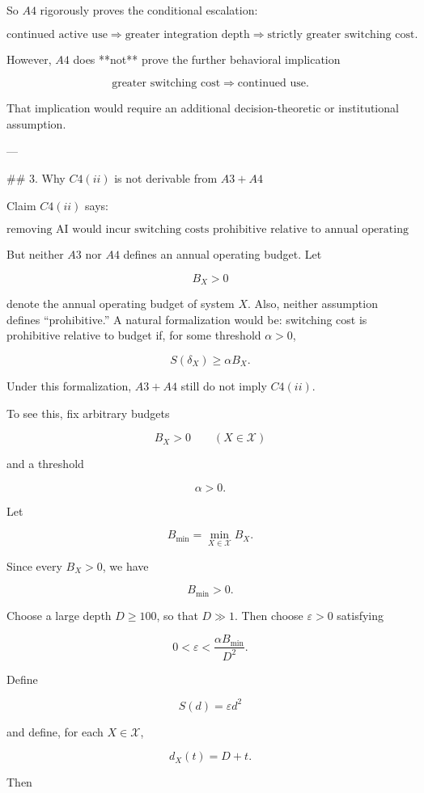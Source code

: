 So \(A4\) rigorously proves the conditional escalation:

\[
\text{continued active use}
\Longrightarrow
\text{greater integration depth}
\Longrightarrow
\text{strictly greater switching cost}.
\]

However, \(A4\) does **not** prove the further behavioral implication

\[
\text{greater switching cost}
\Longrightarrow
\text{continued use}.
\]

That implication would require an additional decision-theoretic or institutional assumption.

---

## 3. Why \(C4(ii)\) is not derivable from \(A3+A4\)

Claim \(C4(ii)\) says:

\[
\text{removing AI would incur switching costs prohibitive relative to annual operating budget.}
\]

But neither \(A3\) nor \(A4\) defines an annual operating budget. Let

\[
B_X>0
\]

denote the annual operating budget of system \(X\). Also, neither assumption defines “prohibitive.” A natural formalization would be: switching cost is prohibitive relative to budget if, for some threshold \(\alpha>0\),

\[
S(\delta_X)\ge \alpha B_X.
\]

Under this formalization, \(A3+A4\) still do not imply \(C4(ii)\).

To see this, fix arbitrary budgets

\[
B_X>0
\qquad
(X\in\mathcal X)
\]

and a threshold

\[
\alpha>0.
\]

Let

\[
B_{\min}=\min_{X\in\mathcal X}B_X.
\]

Since every \(B_X>0\), we have

\[
B_{\min}>0.
\]

Choose a large depth \(D\ge 100\), so that \(D\gg 1\). Then choose \(\varepsilon>0\) satisfying

\[
0<\varepsilon<\frac{\alpha B_{\min}}{D^2}.
\]

Define

\[
S(d)=\varepsilon d^2
\]

and define, for each \(X\in\mathcal X\),

\[
d_X(t)=D+t.
\]

Then

